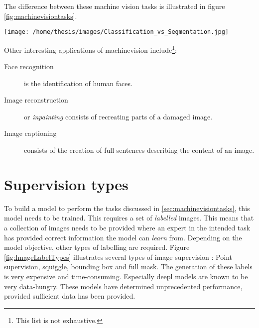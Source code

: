 The difference between these machine vision tasks is illustrated in figure \ref{fig:machinevisiontasks}. 

\begin{SCfigure}[][h!]
    \centering
    \texttt{[image: /home/thesis/images/Classification\_vs\_Segmentation.jpg]}
    \caption{Illustration to compare different Machine vision tasks \cite{SemTorch76:online}. 
    Object detection means that the location of several objects is estimated by the model. This is indicated by the \textit{bounding boxes}.
    Segmentation of an image is the process of classifying each pixel in the correct class or assign it to the \textit{background} class.
    Semantic segmentation makes no difference between different instances of the same semantic class, instance segmentation does.
    \label{fig:machinevisiontasks}}
\end{SCfigure}

Other interesting applications of \gls{machinevision} include\footnote{This list is not exhaustive.}:
\begin{description}
    \item[Face recognition] is the identification of human faces. 
    \item[Image reconstruction] or \textit{inpainting} consists of recreating parts of a damaged image.
    \item[Image captioning] consists of the creation of full sentences describing the content of an image.    
\end{description}



\section{Supervision types}

To build a model to perform the tasks discussed in \ref{sec:machinevisiontasks}, this model needs to be trained.
This requires a set of \textit{labelled} images. 
This means that a collection of images needs to be provided where an expert in the intended task has provided correct information the model can \textit{learn} from.
Depending on the model objective, other types of labelling are required.
Figure \ref{fig:ImageLabelTypes} illustrates several types of image supervision : 
Point supervision, squiggle, bounding box and full mask.
The generation of these labels is very expensive and time-consuming.
Especially \gls{deepl} models are known to be very data-hungry. 
These models have determined unprecedented performance, provided sufficient data has been provided.

